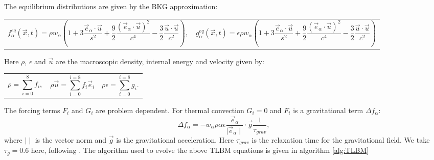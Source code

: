\documentclass{article}
\begin{document}
The equilibrium distributions are given by the BKG approximation:
\newline
\begin{tabularx}{\textwidth}{XX}
\begin{equation}
	f^{eq}_{\alpha}(\vec{x}, t)  = \rho w_{\alpha} (1 + 3 \frac{\vec{e}_{\alpha} \cdot \vec{u}}{s^2} + \frac{9}{2} \frac{(\vec{e}_{\alpha} \cdot \vec{u}  )^2}{c^4} - \frac{3}{2} \frac{\vec{u} \cdot \vec{u}}{c^2}  ),
\end{equation}
    &
\begin{equation}
	g^{eq}_{\alpha}(\vec{x}, t)  = \epsilon \rho w_{\alpha} (1 + 3 \frac{\vec{e}_{\alpha} \cdot \vec{u}}{s^2} + \frac{9}{2} \frac{(\vec{e}_{\alpha} \cdot \vec{u}  )^2}{c^4} - \frac{3}{2} \frac{\vec{u} \cdot \vec{u}}{c^2}  )
\end{equation}
\end{tabularx}\par

Here $\rho$, $\epsilon$ and $\vec{u}$ are the macroscopic density, internal energy and velocity given by:

\begin{tabularx}{\textwidth}{XXX}
\begin{equation}
	\rho = \sum_{i=0}^{8} f_{i},
	\label{LBM rho}
\end{equation}
    &
\begin{equation}
	\rho \vec{u} = \sum_{i=0}^{i=8} f_{i} \vec{e}_{i}
	\label{LBM u}
\end{equation}
	&
\begin{equation}
	\rho \epsilon = \sum_{i=0}^{i=8} g_{i}.
	\label{LBM ep}
\end{equation}
\end{tabularx}\par

The forcing terms $F_i$ and $G_i$ are problem dependent. For thermal convection $G_i=0$ and $F_i$ is a gravitational term ${\Delta f}_{\alpha}$:
\begin{equation}
	{\Delta f}_{\alpha} = - w_{\alpha} \rho \alpha \epsilon \frac{\vec{e}_{\alpha}}{\mid \vec{e}_{\alpha} \mid} \cdot \vec{g} \frac{1}{\tau_{grav}},
\end{equation}
where $\mid \mid$ is the vector norm and $\vec{g}$ is the gravitational acceleration. Here $\tau_{grav}$ is the relaxation time for the gravitational field. We take $\tau_g=0.6$ here, following \cite{mora2017simulation}. The algorithm used to evolve the above TLBM equations is given in algorithm \ref{alg:TLBM}
\end{document}
